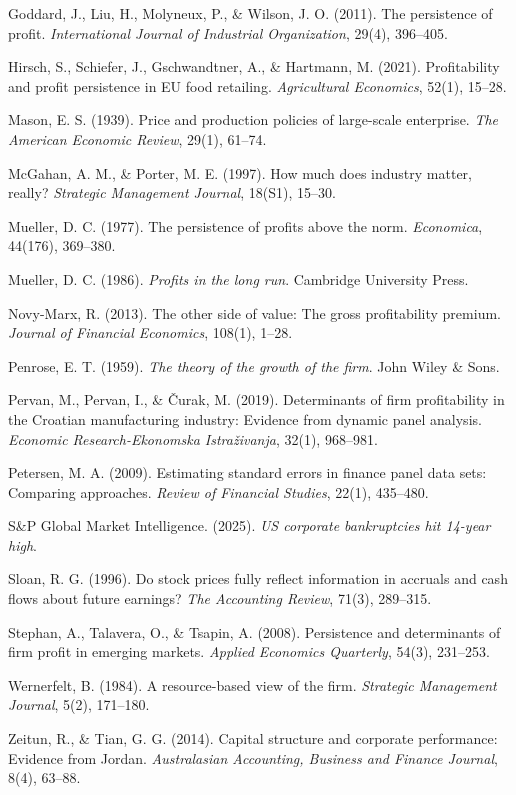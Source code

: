 \documentclass[12pt,a4paper]{report}
\begin{document}
\begin{flushleft}
Goddard, J., Liu, H., Molyneux, P., \& Wilson, J. O. (2011). The persistence of profit. \textit{International Journal of Industrial Organization}, 29(4), 396--405.\par
Hirsch, S., Schiefer, J., Gschwandtner, A., \& Hartmann, M. (2021). Profitability and profit persistence in EU food retailing. \textit{Agricultural Economics}, 52(1), 15--28.\par
Mason, E. S. (1939). Price and production policies of large-scale enterprise. \textit{The American Economic Review}, 29(1), 61--74.\par
McGahan, A. M., \& Porter, M. E. (1997). How much does industry matter, really? \textit{Strategic Management Journal}, 18(S1), 15--30.\par
Mueller, D. C. (1977). The persistence of profits above the norm. \textit{Economica}, 44(176), 369--380.\par
Mueller, D. C. (1986). \textit{Profits in the long run}. Cambridge University Press.\par
Novy-Marx, R. (2013). The other side of value: The gross profitability premium. \textit{Journal of Financial Economics}, 108(1), 1--28.\par
Penrose, E. T. (1959). \textit{The theory of the growth of the firm}. John Wiley \& Sons.\par
Pervan, M., Pervan, I., \& \v{C}urak, M. (2019). Determinants of firm profitability in the Croatian manufacturing industry: Evidence from dynamic panel analysis. \textit{Economic Research-Ekonomska Istra\v{z}ivanja}, 32(1), 968--981.\par
Petersen, M. A. (2009). Estimating standard errors in finance panel data sets: Comparing approaches. \textit{Review of Financial Studies}, 22(1), 435--480.\par
S\&P Global Market Intelligence. (2025). \textit{US corporate bankruptcies hit 14-year high}.\par
Sloan, R. G. (1996). Do stock prices fully reflect information in accruals and cash flows about future earnings? \textit{The Accounting Review}, 71(3), 289--315.\par
Stephan, A., Talavera, O., \& Tsapin, A. (2008). Persistence and determinants of firm profit in emerging markets. \textit{Applied Economics Quarterly}, 54(3), 231--253.\par
Wernerfelt, B. (1984). A resource-based view of the firm. \textit{Strategic Management Journal}, 5(2), 171--180.\par
Zeitun, R., \& Tian, G. G. (2014). Capital structure and corporate performance: Evidence from Jordan. \textit{Australasian Accounting, Business and Finance Journal}, 8(4), 63--88.\par
\end{flushleft}
\end{document}
